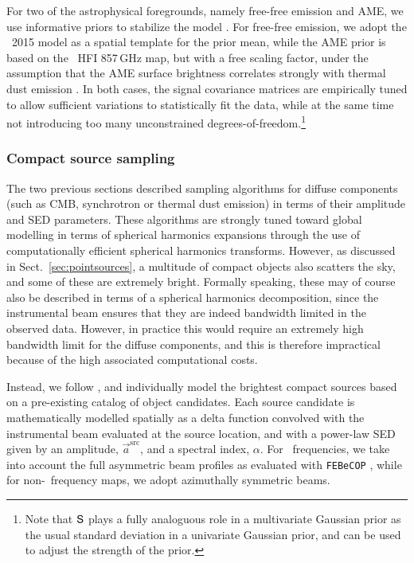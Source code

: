 \documentclass[onecolumn]{aa}
\renewcommand{\a}[0]{\vec{a}}
\renewcommand{\S}[0]{\tens{S}}
\begin{document}
For two of the astrophysical foregrounds, namely free-free emission
and AME, we use informative priors to stabilize the model
\citep{bp13}. For free-free emission, we adopt the \Planck\ 2015 model
\citep{planck2014-a12} as a spatial template for the prior mean, while
the AME prior is based on the \Planck\ HFI 857\,GHz map, but with a
free scaling factor, under the assumption that the AME surface
brightness correlates strongly with thermal dust emission
\citep{planck2014-a12}. In both cases, the signal covariance matrices
are empirically tuned to allow sufficient variations to statistically
fit the data, while at the same time not introducing too many
unconstrained degrees-of-freedom.\footnote{Note that $\S$ plays a
  fully analoguous role in a multivariate Gaussian prior as the usual
  standard deviation in a univariate Gaussian prior, and can be used
  to adjust the strength of the prior.}

\subsubsection{Compact source sampling}
\label{sec:ptsrc}  

The two previous sections described sampling algorithms for diffuse
components (such as CMB, synchrotron or thermal dust emission) in
terms of their amplitude and SED parameters. These algorithms are
strongly tuned toward global modelling in terms of spherical harmonics
expansions through the use of computationally efficient spherical
harmonics transforms. However, as discussed in
Sect.~\ref{sec:pointsources}, a multitude of compact objects also
scatters the sky, and some of these are extremely bright. Formally
speaking, these may of course also be described in terms of a
spherical harmonics decomposition, since the instrumental beam ensures
that they are indeed bandwidth limited in the observed data. However,
in practice this would require an extremely high bandwidth limit for the
diffuse components, and this is therefore impractical because of the
high associated computational costs.

Instead, we follow \citet{planck2016-l04}, and individually model the
brightest compact sources based on a pre-existing catalog of object
candidates. Each source candidate is mathematically modelled spatially
as a delta function convolved with the instrumental beam evaluated at
the source location, and with a power-law SED given by an amplitude,
$\a^{\mathrm{src}}$, and a spectral index, $\alpha$. For
\Planck\ frequencies, we take into account the full asymmetric beam
profiles as evaluated with \texttt{FEBeCOP} \citep{mitra2010}, while for
non-\Planck\ frequency maps, we adopt azimuthally symmetric beams.
\end{document}
